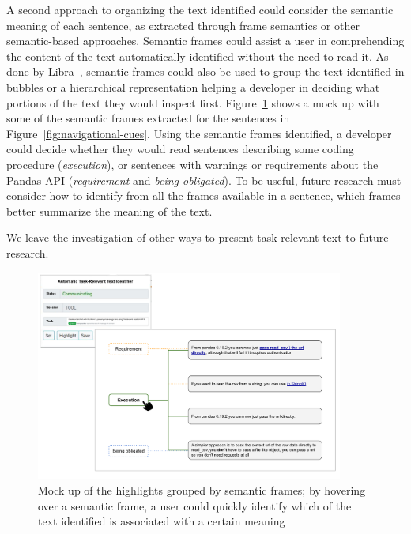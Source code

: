 A second approach to organizing the text identified could consider 
the semantic meaning of each sentence, as extracted through frame semantics or other semantic-based approaches. 
Semantic frames could 
assist a user in comprehending the content of the text automatically identified
without the need to read it. 
As done by Libra~\cite{Ponzanelli2017}, semantic frames could also be used to group the text identified in bubbles or a hierarchical representation 
 helping a developer
in deciding what portions of the text they would inspect first. 
Figure~\ref{fig:semantic-cues} shows a mock up 
with some of the semantic frames extracted 
for the sentences in Figure~\ref{fig:navigational-cues}.
Using the semantic frames identified,
a developer could decide whether they would read sentences 
describing some coding procedure (\textit{execution}), or sentences 
with warnings or requirements about the Pandas API (\textit{requirement} and \textit{being obligated}). 
To be useful, future research must consider how to identify from all the frames available in a sentence, 
which frames
better summarize the meaning of the text. 


We leave the investigation of other ways to present task-relevant text to future research.




\begin{figure}
    \centering
    \includegraphics[width=0.90\textwidth]{fig/cp7/semantic-cues}
    \caption{Mock up of the highlights grouped by semantic frames; by hovering over a semantic frame, a user could quickly identify which of the text identified is associated with a certain meaning}
    \label{fig:semantic-cues}
\end{figure}





